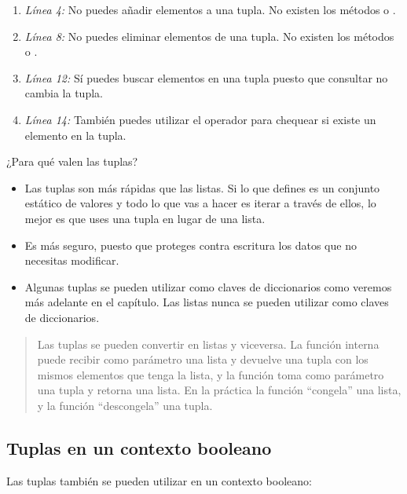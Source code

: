 \begin{enumerate}

\item \emph{Línea 4:} No puedes añadir elementos a una tupla. No existen los métodos  o .

\item \emph{Línea 8:} No puedes eliminar elementos de una tupla. No existen los métodos  o .

\item \emph{Línea 12:} Sí puedes buscar elementos en una tupla puesto que consultar no cambia la tupla.

\item \emph{Línea 14:} También puedes utilizar el operador  para chequear si existe un elemento en la tupla.

\end{enumerate}

¿Para qué valen las tuplas?

\begin{itemize}

\item Las tuplas son más rápidas que las listas. Si lo que defines es un conjunto estático de valores y todo lo que vas a hacer es iterar a través de ellos, lo mejor es que uses una tupla en lugar de una lista.

\item Es más seguro, puesto que proteges contra escritura los datos que no necesitas modificar.

\item Algunas tuplas se pueden utilizar como claves de diccionarios como veremos más adelante en el capítulo. Las listas nunca se pueden utilizar como claves de diccionarios.

\end{itemize}

\begin{quote}
Las tuplas se pueden convertir en listas y viceversa. La función interna  puede recibir como parámetro una lista y devuelve una tupla con los mismos elementos que tenga la lista, y la función  toma como parámetro una tupla y retorna una lista. En la práctica la función  ``congela'' una lista, y la función  ``descongela'' una tupla.
\end{quote}

\subsection{Tuplas en un contexto booleano}
Las tuplas también se pueden utilizar en un contexto booleano:

